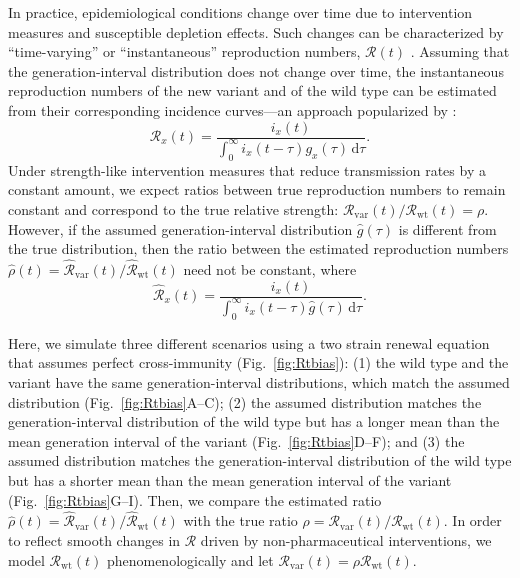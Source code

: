 \documentclass[12pt]{article}
\newcommand{\fref}[1]{Fig.~\ref{fig:#1}}
\newcommand{\Rx}[1]{\ensuremath{{\mathcal R}_{#1}}\xspace}
\newcommand{\Ry}[1]{\Rx{\mathrm{#1}}}
\newcommand{\RR}{\ensuremath{{\mathcal R}}\xspace}
\newcommand{\dd}[1]{\ensuremath{\, \mathrm{d}#1}}
\newcommand{\dtau}{\dd{\tau}}
\begin{document}
In practice, epidemiological conditions change over time due to intervention measures and susceptible depletion effects.
Such changes can be characterized by ``time-varying'' or ``instantaneous'' reproduction numbers, $\RR(t)$ \citep{fraser2007estimating}.
Assuming that the generation-interval distribution does not change over time, the instantaneous reproduction numbers of the new variant and of the wild type can be estimated from their corresponding incidence curves---an approach popularized by \cite{cori2013new}:
\begin{equation}
\RR_x(t) = \frac{i_x(t)}{\int_0^\infty i_x(t-\tau) g_x(\tau) \dtau}.
\end{equation}
Under strength-like intervention measures that reduce transmission rates by a constant amount, we expect ratios between true reproduction numbers to remain constant and correspond to the true relative strength: $\Ry{var}(t)/\Ry{wt}(t) = \rho$.
However, if the assumed generation-interval distribution $\hat{g}(\tau)$ is different from the true distribution, then the ratio between the estimated reproduction numbers $\hat{\rho}(t) = \hat{\RR}_{\textrm{var}}(t)/\hat{\RR}_{\textrm{wt}}(t)$ need not be constant, where
\begin{equation}
\hat{\RR}_x(t) = \frac{i_x(t)}{\int_0^\infty i_x(t-\tau) \hat{g}(\tau) \dtau}.
\end{equation}

Here, we simulate three different scenarios using a two strain renewal equation that assumes perfect cross-immunity (\fref{Rtbias}): 
(1) the wild type and the variant have the same generation-interval distributions, which match the assumed distribution (\fref{Rtbias}A--C);
(2) the assumed distribution matches the generation-interval distribution of the wild type but has a longer mean than the mean generation interval of the variant (\fref{Rtbias}D--F); and
(3) the assumed distribution matches the generation-interval distribution of the wild type but has a shorter mean than the mean generation interval of the variant (\fref{Rtbias}G--I).
Then, we compare the estimated ratio $\hat{\rho}(t) = \hat{\RR}_{\textrm{var}}(t)/\hat{\RR}_{\textrm{wt}}(t)$ with the true ratio $\rho = \Ry{var}(t)/\Ry{wt}(t)$.
In order to reflect smooth changes in $\RR$ driven by non-pharmaceutical interventions, we model $\Ry{wt}(t)$ phenomenologically and let $\Ry{var}(t) = \rho \Ry{wt}(t)$.
\end{document}
